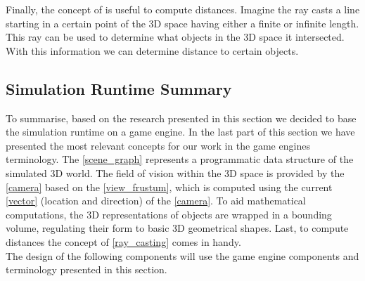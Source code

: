Finally, the concept of \emph{} is useful to compute distances. Imagine the ray casts a line starting in a certain point of the 3D space having either a finite or infinite length. This ray can be used to determine what objects in the 3D space it intersected. With this information we can determine distance to certain objects.\\

\subsection{Simulation Runtime Summary}\label{subsec:simulation_runtime_summary}
To summarise, based on the research presented in this section we decided to base the simulation runtime on a game engine. In the last part of this section we have presented the most relevant concepts for our work in the game engines terminology. The \ref{scene_graph} represents a programmatic data structure of the simulated 3D world. The field of vision within the 3D space is provided by the \ref{camera} based on the \ref{view_frustum}, which is computed using the current \ref{vector} (location and direction) of the \ref{camera}. To aid mathematical computations, the 3D representations of objects are wrapped in a bounding volume, regulating their form to basic 3D geometrical shapes. Last, to compute distances the concept of \ref{ray_casting} comes in handy.\\

The design of the following components will use the game engine components and terminology presented in this section.

